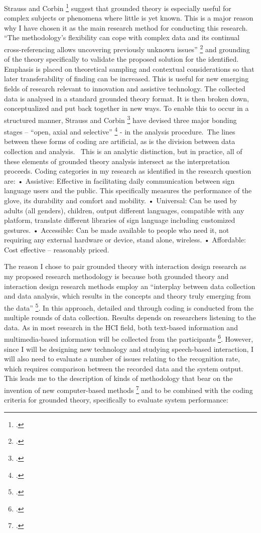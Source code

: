 Strauss and Corbin \footcite{Strauss2008} suggest that grounded theory is especially useful for complex subjects or phenomena where little is yet known. This is a major reason why I have chosen it as the main research method for conducting this research.  “The methodology’s ﬂexibility can cope with complex data and its continual cross-referencing allows uncovering previously unknown issues” \footcite{Strauss2008} and grounding of the theory specifically to validate the proposed solution for the identified.  Emphasis is placed on theoretical sampling and contextual considerations so that later transferability of finding can be increased. 
This is useful for new emerging fields of research relevant to innovation and assistive technology. 
The collected data is analysed in a standard grounded theory format. It is then broken down, conceptualized and put back together in new ways.  To enable this to occur in a structured manner, Strauss and Corbin \footcite{Strauss2008} have devised three major bonding stages – “open, axial and selective” \footcite{Strauss2008} - in the analysis procedure. The lines between these forms of coding are artificial, as is the division between data collection and analysis.  This is an analytic distinction, but in practice, all of these elements of grounded theory analysis intersect as the interpretation proceeds.
Coding categories in my research as identified in the research question are:
•	Assistive:  Effective in facilitating daily communication between sign language users and the public.  This specifically measures the performance of the glove, its durability and comfort and mobility.
•	Universal: Can be used by adults (all genders), children, output different languages, compatible with any platform, translate different libraries of sign language including customized gestures.
•	Accessible: Can be made available to people who need it, not requiring any external hardware or device, stand alone, wireless.
•	Affordable: Cost effective – reasonably priced.

The reason I chose to pair grounded theory with interaction design research as my proposed research methodology is because both grounded theory and interaction design research methods employ an “interplay between data collection and data analysis, which results in the concepts and theory truly emerging from the data” \footcite{Lazar2010}. In this approach, detailed and through coding is conducted from the multiple rounds of data collection.  Results depends on researchers listening to the data.  As in most research in the HCI field, both text-based information and multimedia-based information will be collected from the participants \footcite{Lazar2010}. 
However, since I will be designing new technology and studying speech-based interaction, I will also need to evaluate a number of issues relating to the recognition rate, which requires comparison between the recorded data and the system output. 
This leads me to the description of kinds of methodology that bear on the invention of new computer-based methods \footcite{Rogers2011} and to be combined with the coding criteria for grounded theory, specifically to evaluate system performance: 

